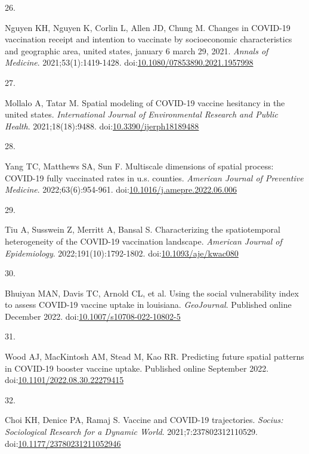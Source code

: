 \documentclass[
]{article}
\newlength{\cslhangindent}
\newlength{\csllabelwidth}
\newlength{\cslentryspacingunit} %
\newenvironment{CSLReferences}[2] %
 {%
  \setlength{\parindent}{0pt}
  \ifodd #1
  \let\oldpar\par
  \def\par{\hangindent=\cslhangindent\oldpar}
  \fi
  \setlength{\parskip}{#2\cslentryspacingunit}
 }%
 {}
\newcommand{\CSLLeftMargin}[1]{\parbox[t]{\csllabelwidth}{#1}}
\newcommand{\CSLRightInline}[1]{\parbox[t]{\linewidth - \csllabelwidth}{#1}\break}
\begin{document}
\begin{CSLReferences}{0}{0}
\leavevmode{}%
\CSLLeftMargin{26. }%
\CSLRightInline{Nguyen KH, Nguyen K, Corlin L, Allen JD, Chung M.
Changes in {COVID}-19 vaccination receipt and intention to vaccinate by
socioeconomic characteristics and geographic area, united states,
january 6 {\textendash} march 29, 2021. \emph{Annals of Medicine}.
2021;53(1):1419-1428.
doi:\href{https://doi.org/10.1080/07853890.2021.1957998}{10.1080/07853890.2021.1957998}}

\leavevmode{}%
\CSLLeftMargin{27. }%
\CSLRightInline{Mollalo A, Tatar M. Spatial modeling of {COVID}-19
vaccine hesitancy in the united states. \emph{International Journal of
Environmental Research and Public Health}. 2021;18(18):9488.
doi:\href{https://doi.org/10.3390/ijerph18189488}{10.3390/ijerph18189488}}

\leavevmode{}%
\CSLLeftMargin{28. }%
\CSLRightInline{Yang TC, Matthews SA, Sun F. Multiscale dimensions of
spatial process: {COVID}-19 fully vaccinated rates in u.s. counties.
\emph{American Journal of Preventive Medicine}. 2022;63(6):954-961.
doi:\href{https://doi.org/10.1016/j.amepre.2022.06.006}{10.1016/j.amepre.2022.06.006}}

\leavevmode{}%
\CSLLeftMargin{29. }%
\CSLRightInline{Tiu A, Susswein Z, Merritt A, Bansal S. Characterizing
the spatiotemporal heterogeneity of the {COVID}-19 vaccination
landscape. \emph{American Journal of Epidemiology}.
2022;191(10):1792-1802.
doi:\href{https://doi.org/10.1093/aje/kwac080}{10.1093/aje/kwac080}}

\leavevmode{}%
\CSLLeftMargin{30. }%
\CSLRightInline{Bhuiyan MAN, Davis TC, Arnold CL, et al. Using the
social vulnerability index to assess {COVID}-19 vaccine uptake in
louisiana. \emph{{GeoJournal}}. Published online December 2022.
doi:\href{https://doi.org/10.1007/s10708-022-10802-5}{10.1007/s10708-022-10802-5}}

\leavevmode{}%
\CSLLeftMargin{31. }%
\CSLRightInline{Wood AJ, MacKintosh AM, Stead M, Kao RR. Predicting
future spatial patterns in {COVID}-19 booster vaccine uptake. Published
online September 2022.
doi:\href{https://doi.org/10.1101/2022.08.30.22279415}{10.1101/2022.08.30.22279415}}

\leavevmode{}%
\CSLLeftMargin{32. }%
\CSLRightInline{Choi KH, Denice PA, Ramaj S. Vaccine and {COVID}-19
trajectories. \emph{Socius: Sociological Research for a Dynamic World}.
2021;7:237802312110529.
doi:\href{https://doi.org/10.1177/23780231211052946}{10.1177/23780231211052946}}


\end{CSLReferences}
\end{document}
